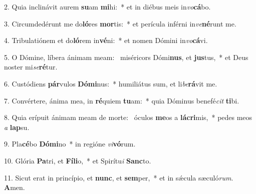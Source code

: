 2. Quia inclinávit aurem \textbf{su}am \textbf{mi}hi:~*  et in diébus meis in\textit{vo}\textbf{cá}bo.\

3. Circumdedérunt me do\textbf{ló}res \textbf{mor}tis:~*  et perícula inférni in\textit{ve}\textbf{né}runt me.\

4. Tribulatiónem et do\textbf{ló}rem in\textbf{vé}ni:~*  et nomen Dómini in\textit{vo}\textbf{cá}vi.\

5. O Dómine, líbera ánimam meam: \dag\  miséricors Dómi\textbf{nus}, et \textbf{jus}tus,~*  et Deus noster mi\textit{se}\textbf{ré}tur.\

6. Custódiens \textbf{pár}vulos \textbf{Dó}\textbf{mi}nus:~*  humiliátus sum, et li\textit{be}\textbf{rá}vit me.\

7. Convértere, ánima mea, in \textbf{ré}quiem \textbf{tu}am:~*  quia Dóminus benefé\textit{cit} \textbf{ti}bi.\

8. Quia erípuit ánimam meam de morte: \dag\  óculos \textbf{me}os a \textbf{lá}\textbf{cri}mis,~*  pedes meos \textit{a} \textbf{lap}su.\

9. Pla\textbf{cé}bo \textbf{Dó}\textbf{mi}no~*  in regióne \textit{vi}\textbf{vó}rum.\

10. Glória \textbf{Pa}tri, et \textbf{Fí}\textbf{li}o,~*  et Spirítu\textit{i} \textbf{Sanc}to.\

11. Sicut erat in princípio, et \textbf{nunc}, et \textbf{sem}per,~*  et in sǽcula sæculó\textit{rum}. \textbf{A}men.\

